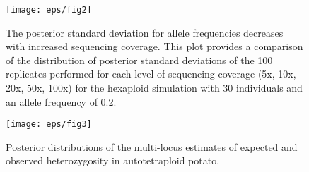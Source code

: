 \documentclass[11pt,english,letterpaper,oneside]{article}
\begin{document}
\begin{figure}
\centering
\caption{The posterior standard deviation for allele frequencies decreases with increased sequencing coverage. This plot provides a comparison of the distribution of posterior standard deviations of the 100 replicates performed for each level of sequencing coverage (5x, 10x, 20x, 50x, 100x) for the hexaploid simulation with 30 individuals and an allele frequency of 0.2.}
\vspace{0.25in}
\texttt{[image: eps/fig2]}
\label{fig2:coverage-sd}
\end{figure}


\begin{figure}
\centering
\caption{Posterior distributions of the multi-locus estimates of expected and observed heterozygosity in autotetraploid potato.}
\vspace{0.25in}
\texttt{[image: eps/fig3]}
\label{fig3:het}
\end{figure}
\end{document}
